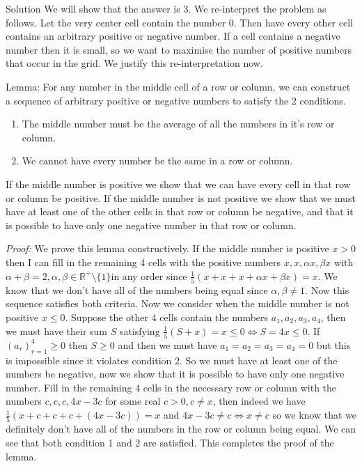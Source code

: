 \documentclass{article}
\begin{document}
\begin{solution}{Solution}
We will show that the answer is 3.
We re-interpret the problem as follows. Let the very center cell contain
the number 0. Then have every other cell contains an arbitrary positive or
negative number. If a cell contains a negative number then it is small, so
we want to maximise the number of positive numbers that occur in the grid.
We justify this re-interpretation now.
\\

\begin{itshape}
Lemma: For any number in the middle cell of a row or column, we
can construct a sequence of arbitrary positive or negative numbers to
satisfy the 2 conditions.

\begin{enumerate}
\item The middle number must be the average of all the numbers in it's row or column.

\item We cannot have every number be the same in a row or column.
\end{enumerate}

If the middle number is positive we show that we can have every cell in
that row or column be positive. If the middle number is not positive we
show that we must have at least one of the other cells in that row or
column be negative, and that it is possible to have only one negative
number in that row or column.\\
\end{itshape}

\textit{Proof:} We prove this lemma constructively. If the middle number is
positive $x > 0$ then I can fill in the remaining 4 cells with the
positive numbers $x, x, \alpha x, \beta x$ with $\alpha + \beta = 2, \alpha, \beta \in \mathbb{R}^{+} \setminus \{ 1\}  $in any order since
$\frac{1}{5} (x + x + x + \alpha x + \beta x) = x$. We know that we don't
have all of the numbers being equal since $\alpha, \beta \neq 1$.
Now this sequence satisfies
both criteria. Now we consider when the middle number is not positive
$x \leq 0$. Suppose the other 4 cells contain the numbers
$a_1, a_2, a_3, a_4$, then we must have their sum $S$ satisfying
$\frac{1}{5}(S+x) = x \leq 0 \iff S = 4x \leq 0$. If $(a_r)_{r=1}^4 \geq 0$ then $S \geq 0$ and
then we must have $a_1=a_2=a_3=a_4=0$ but this is impossible since it
violates condition 2. So we must have at least one of the numbers be
negative, now we show that it is possible to have only one negative number.
Fill in the remaining 4 cells in the necessary row or column with the
numbers $c,c,c,4x-3c$ for some real $c>0, c\neq x$, then indeed we have
$\frac{1}{5} (x+c+c+c+(4x-3c)) = x$ and $4x-3c \neq c \iff x \neq c$ so we
know that we definitely don't have all of the numbers in the row or
column being equal. We can see that both condition 1 and 2 are satisfied.
This completes the proof of the lemma. \\


\end{solution}
\end{document}

